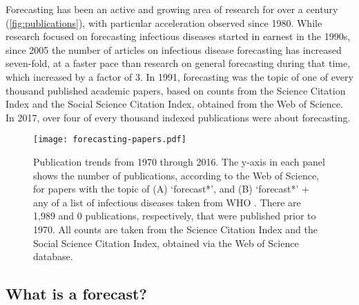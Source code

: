 \documentclass[a4paper]{article}
\begin{document}
Forecasting has been an active and growing area of research for over a century (\autoref{fig:publications}), with particular acceleration observed since 1980.
While research focused on forecasting infectious diseases started in earnest in the 1990s, since 2005 the number of articles on infectious disease forecasting has increased seven-fold, at a faster pace than research on general forecasting during that time, which increased by a factor of 3.
In 1991, forecasting was the topic of one of every thousand published academic papers, based on counts from the Science Citation Index and the Social Science Citation Index, obtained from the Web of Science.
In 2017, over four of every thousand indexed publications were about forecasting.

\begin{figure}[htbp]
\begin{center}
\texttt{[image: forecasting-papers.pdf]}
\caption{Publication trends from 1970 through 2016. The y-axis in each panel shows the number of publications, according to the Web of Science, for papers with the topic of (A) `forecast*', and (B) `forecast*' + any of a list of infectious diseases taken from WHO \cite{WHO-all-id}. There are 1,989 and 0 publications, respectively, that were published prior to 1970. All counts are taken from the Science Citation Index and the Social Science Citation Index, obtained via the Web of Science database.}
\label{fig:publications}
\end{center}
\end{figure}

\subsection{What is a forecast?}\label{sec:what}
\end{document}

